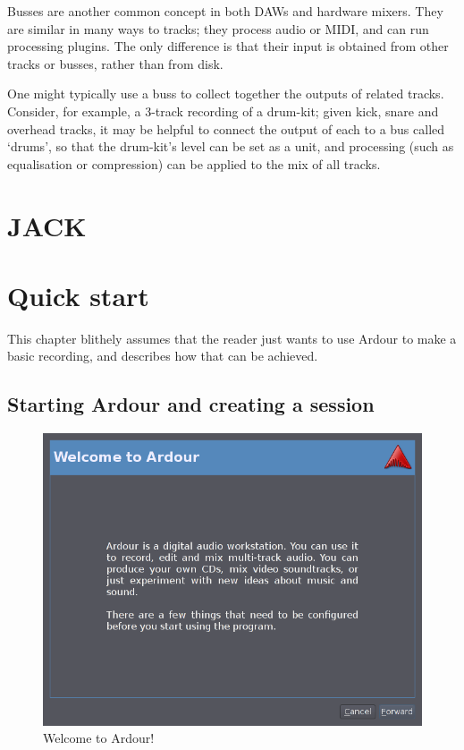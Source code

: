 \documentclass{book}
\begin{document}
Busses are another common concept in both DAWs and hardware mixers.
They are similar in many ways to tracks; they process audio or MIDI,
and can run processing plugins.  The only difference is that their
input is obtained from other tracks or busses, rather than from disk.

One might typically use a buss to collect together the outputs of
related tracks.  Consider, for example, a 3-track recording of a
drum-kit; given kick, snare and overhead tracks, it may be helpful to
connect the output of each to a bus called `drums', so that the
drum-kit's level can be set as a unit, and processing (such as
equalisation or compression) can be applied to the mix of all tracks.


\chapter{JACK}
\label{ch:jack}

\chapter{Quick start}

This chapter blithely assumes that the reader just wants to use Ardour
to make a basic recording, and describes how that can be achieved.

\section{Starting Ardour and creating a session}

\begin{figure}[ht]
\begin{center}
\includegraphics[scale=0.5]{screenshots/welcome-to-ardour.png}
\end{center}
\caption{Welcome to Ardour!}
\label{fig:welcome-to-ardour}
\end{figure}
\end{document}
